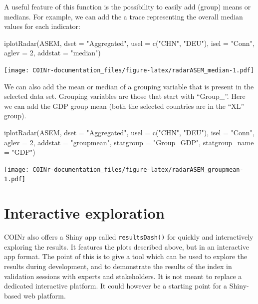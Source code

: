 \documentclass[
]{book}
\newenvironment{Shaded}{\begin{snugshade}}{\end{snugshade}}
\newcommand{\AttributeTok}[1]{\textcolor[rgb]{0.77,0.63,0.00}{#1}}
\newcommand{\DecValTok}[1]{\textcolor[rgb]{0.00,0.00,0.81}{#1}}
\newcommand{\FunctionTok}[1]{\textcolor[rgb]{0.00,0.00,0.00}{#1}}
\newcommand{\NormalTok}[1]{#1}
\newcommand{\StringTok}[1]{\textcolor[rgb]{0.31,0.60,0.02}{#1}}
\begin{document}
A useful feature of this function is the possibility to easily add (group) means or medians. For example, we can add the a trace representing the overall median values for each indicator:

\begin{Shaded}
\begin{Highlighting}[]
\FunctionTok{iplotRadar}\NormalTok{(ASEM, }\AttributeTok{dset =} \StringTok{"Aggregated"}\NormalTok{, }\AttributeTok{usel =} \FunctionTok{c}\NormalTok{(}\StringTok{"CHN"}\NormalTok{, }\StringTok{"DEU"}\NormalTok{), }\AttributeTok{isel =} \StringTok{"Conn"}\NormalTok{, }\AttributeTok{aglev =} \DecValTok{2}\NormalTok{, }\AttributeTok{addstat =} \StringTok{"median"}\NormalTok{)}
\end{Highlighting}
\end{Shaded}

\texttt{[image: COINr-documentation\_files/figure-latex/radarASEM\_median-1.pdf]}

We can also add the mean or median of a grouping variable that is present in the selected data set. Grouping variables are those that start with ``Group\_''. Here we can add the GDP group mean (both the selected countries are in the ``XL'' group).

\begin{Shaded}
\begin{Highlighting}[]
\FunctionTok{iplotRadar}\NormalTok{(ASEM, }\AttributeTok{dset =} \StringTok{"Aggregated"}\NormalTok{, }\AttributeTok{usel =} \FunctionTok{c}\NormalTok{(}\StringTok{"CHN"}\NormalTok{, }\StringTok{"DEU"}\NormalTok{), }\AttributeTok{isel =} \StringTok{"Conn"}\NormalTok{, }\AttributeTok{aglev =} \DecValTok{2}\NormalTok{, }\AttributeTok{addstat =} \StringTok{"groupmean"}\NormalTok{,}
           \AttributeTok{statgroup =} \StringTok{"Group\_GDP"}\NormalTok{, }\AttributeTok{statgroup\_name =} \StringTok{"GDP"}\NormalTok{)}
\end{Highlighting}
\end{Shaded}

\texttt{[image: COINr-documentation\_files/figure-latex/radarASEM\_groupmean-1.pdf]}

\hypertarget{interactive-exploration}{%
\section{Interactive exploration}\label{interactive-exploration}}

COINr also offers a Shiny app called \texttt{resultsDash()} for quickly and interactively exploring the results. It features the plots described above, but in an interactive app format. The point of this is to give a tool which can be used to explore the results during development, and to demonstrate the results of the index in validation sessions with experts and stakeholders. It is not meant to replace a dedicated interactive platform. It could however be a starting point for a Shiny-based web platform.
\end{document}
